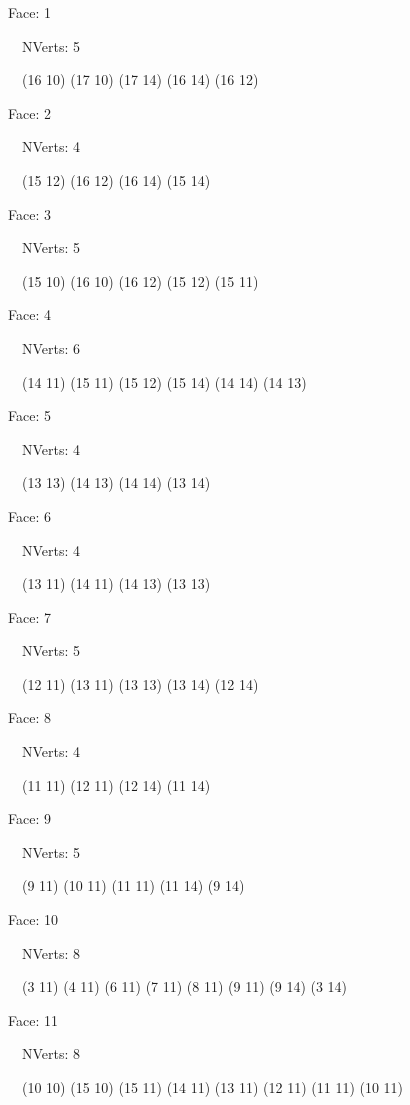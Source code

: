 \documentclass{article}
\begin{document}
{\footnotesize 

Face: 1

\   \    NVerts: 5

 \   \   (16 10) (17 10) (17 14) (16 14) (16 12)}

{\footnotesize 

Face: 2

\   \    NVerts: 4

 \   \   (15 12) (16 12) (16 14) (15 14)}

{\footnotesize 

Face: 3

\   \    NVerts: 5

 \   \   (15 10) (16 10) (16 12) (15 12) (15 11)}

{\footnotesize 

Face: 4

\   \    NVerts: 6

 \   \   (14 11) (15 11) (15 12) (15 14) (14 14) (14 13)}

{\footnotesize 

Face: 5

\   \    NVerts: 4

 \   \   (13 13) (14 13) (14 14) (13 14)}

{\footnotesize 

Face: 6

\   \    NVerts: 4

 \   \   (13 11) (14 11) (14 13) (13 13)}

{\footnotesize 

Face: 7

\   \    NVerts: 5

 \   \   (12 11) (13 11) (13 13) (13 14) (12 14)}

{\footnotesize 

Face: 8

\   \    NVerts: 4

 \   \   (11 11) (12 11) (12 14) (11 14)}

{\footnotesize 

Face: 9

\   \    NVerts: 5

 \   \   (9 11) (10 11) (11 11) (11 14) (9 14)}

{\footnotesize 

Face: 10

\   \    NVerts: 8

 \   \   (3 11) (4 11) (6 11) (7 11) (8 11) (9 11) (9 14) (3 14)}

{\footnotesize 

Face: 11

\   \    NVerts: 8

 \   \   (10 10) (15 10) (15 11) (14 11) (13 11) (12 11) (11 11) (10 11)}
\end{document}

